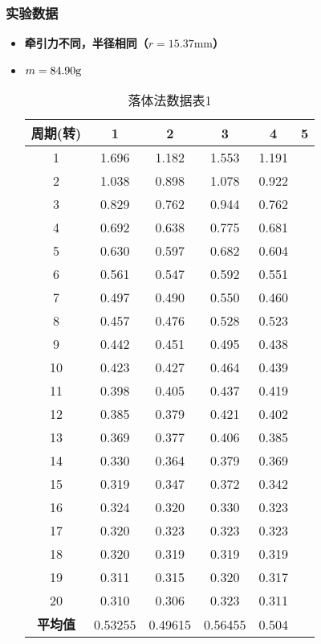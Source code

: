 \documentclass[12pt,hyperref,a4paper,UTF8]{ctexart}
\begin{document}
\subsubsection{实验数据}
    \begin{itemize}
        \item \textbf{牵引力不同，半径相同（$r=15.37\text{mm}$）}
            \item $m=84.90\text g$
            
                \begin{table}[h!]
                \centering
                \begin{tabular}{cccccc}
                \toprule
                \textbf{周期(转)} & \textbf{1} & \textbf{2} & \textbf{3} & \textbf{4} & \textbf{5} \\
                \midrule
                1  & 1.696 & 1.182 & 1.553 & 1.191 \\
                2  & 1.038 & 0.898 & 1.078 & 0.922 \\
                3  & 0.829 & 0.762 & 0.944 & 0.762 \\
                4  & 0.692 & 0.638 & 0.775 & 0.681 \\
                5  & 0.630 & 0.597 & 0.682 & 0.604 \\
                6  & 0.561 & 0.547 & 0.592 & 0.551 \\
                7  & 0.497 & 0.490 & 0.550 & 0.460 \\
                8  & 0.457 & 0.476 & 0.528 & 0.523 \\
                9  & 0.442 & 0.451 & 0.495 & 0.438 \\
                10 & 0.423 & 0.427 & 0.464 & 0.439 \\
                11 & 0.398 & 0.405 & 0.437 & 0.419 \\
                12 & 0.385 & 0.379 & 0.421 & 0.402 \\
                13 & 0.369 & 0.377 & 0.406 & 0.385 \\
                14 & 0.330 & 0.364 & 0.379 & 0.369 \\
                15 & 0.319 & 0.347 & 0.372 & 0.342 \\
                16 & 0.324 & 0.320 & 0.330 & 0.323 \\
                17 & 0.320 & 0.323 & 0.323 & 0.323 \\
                18 & 0.320 & 0.319 & 0.319 & 0.319 \\
                19 & 0.311 & 0.315 & 0.320 & 0.317 \\
                20 & 0.310 & 0.306 & 0.323 & 0.311 \\
                \midrule
                \textbf{平均值} & 0.53255 & 0.49615 & 0.56455 & 0.504 \\
                \bottomrule
                \end{tabular}
                \caption{落体法数据表1}
                \end{table}


\end{itemize}
\end{document}
